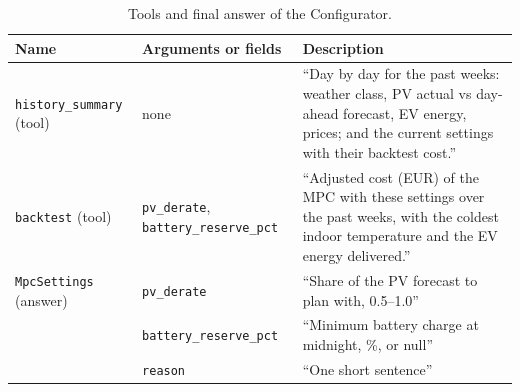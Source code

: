 \begin{table}[htbp]
\caption{Tools and final answer of the Configurator.}
\label{tab:schemaconfig}
\small
\begin{tabularx}{\textwidth}{@{}>{\raggedright\arraybackslash}p{3.4cm}>{\raggedright\arraybackslash}p{3.6cm}X@{}}
\toprule
Name & Arguments or fields & Description \\
\midrule
\texttt{history\_summary} (tool) & none & ``Day by day for the past weeks: weather class, PV actual vs day-ahead forecast, EV energy, prices; and the current settings with their backtest cost.'' \\
\texttt{backtest} (tool) & \texttt{pv\_derate}, \texttt{battery\_reserve\_\allowbreak pct} & ``Adjusted cost (EUR) of the MPC with these settings over the past weeks, with the coldest indoor temperature and the EV energy delivered.'' \\
\texttt{MpcSettings} (answer) & \texttt{pv\_derate} & ``Share of the PV forecast to plan with, 0.5--1.0'' \\
 & \texttt{battery\_reserve\_\allowbreak pct} & ``Minimum battery charge at midnight, \%, or null'' \\
 & \texttt{reason} & ``One short sentence'' \\
\bottomrule
\end{tabularx}
\end{table}


